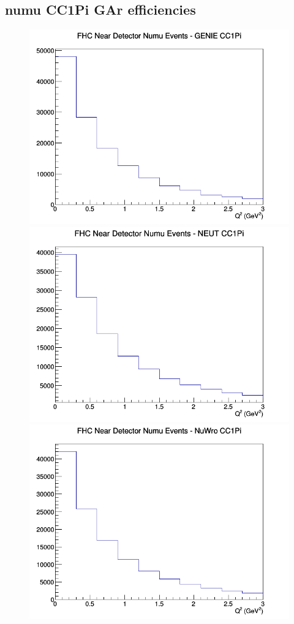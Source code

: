 \documentclass[12pt]{article}
\begin{document}
\subsection{numu CC1Pi GAr efficiencies}
\begin{figure}[h]
\includegraphics[width=\linewidth]{eff_Q2/GAr/CC1Pi_FHC_ND_numu_Q2_GENIE.png}
\endminipage
{}
\includegraphics[width=\linewidth]{eff_Q2/GAr/CC1Pi_FHC_ND_numu_Q2_NEUT.png}
\endminipage
{}
\includegraphics[width=\linewidth]{eff_Q2/GAr/CC1Pi_FHC_ND_numu_Q2_NuWro.png}

\end{figure}
\end{document}
